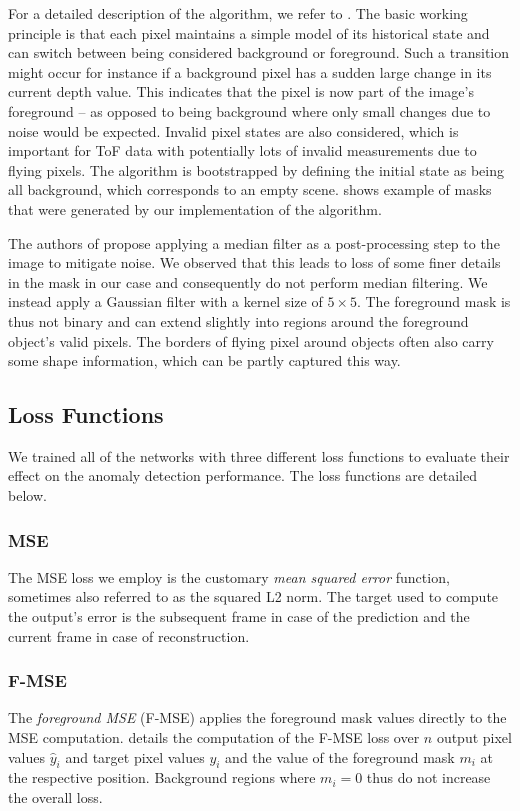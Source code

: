 \documentclass[10pt,twocolumn,letterpaper]{article}
\begin{document}
For a detailed description of the algorithm, we refer to \cite{physically_based_BGS}. The basic working principle is that each pixel maintains a simple model of its historical state and can switch between being considered background or foreground. Such a transition might occur for instance if a background pixel has a sudden large change in its current depth value. This indicates that the pixel is now part of the image's foreground -- as opposed to being background where only small changes due to noise would be expected. Invalid pixel states are also considered, which is important for ToF data with potentially lots of invalid measurements due to \eg flying pixels. The algorithm is bootstrapped by defining the initial state as being all background, which corresponds to an empty scene.  shows example of masks that were generated by our implementation of the algorithm.

The authors of \cite{physically_based_BGS} propose applying a median filter as a post-processing step to the image to mitigate noise. We observed that this leads to loss of some finer details in the mask in our case and consequently do not perform median filtering. We instead apply a Gaussian filter with a kernel size of $5{\times}5$. The foreground mask is thus not binary and can extend slightly into regions around the foreground object's valid pixels. The borders of flying pixel around objects often also carry some shape information, which can be partly captured this way.

\subsection{Loss Functions} \label{sec:loss_fns}
We trained all of the networks with three different loss functions to evaluate their effect on the anomaly detection performance. The loss functions are detailed below.

\subsubsection{MSE}
The MSE loss we employ is the customary \emph{mean squared error} function, sometimes also referred to as the squared L2 norm. The target used to compute the output's error is the subsequent frame in case of the prediction and the current frame in case of reconstruction.

\subsubsection{F-MSE}
The \emph{foreground MSE} (F-MSE) applies the foreground mask values directly to the MSE computation.  details the computation of the F-MSE loss over $n$ output pixel values $\hat{y}_i$ and target pixel values $y_i$ and the value of the foreground mask $m_i$ at the respective position. Background regions where $m_i = 0$ thus do not increase the overall loss.
\end{document}
